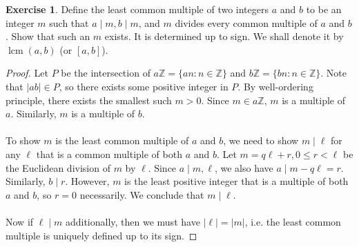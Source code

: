 \documentclass{article}
\theoremstyle{definition}
\newtheorem{exercise}{Exercise}
\begin{document}
\begin{exercise}
Define the least common multiple of two integers $a$ and $b$ to be an integer $m$ such that $a \mid m, b \mid m$, and $m$  divides every common multiple of $a$ and $b$. Show that such an $m$ exists. It is determined up to sign. We shall denote it by $\operatorname{lcm}(a, b)$ (or $[a, b]$).
\end{exercise}
\begin{proof}
Let $P$ be the intersection of $a \mathbb{Z} = \{ an : n \in \mathbb{Z} \}$ and $b \mathbb{Z} = \{ bn : n \in \mathbb{Z} \}$. Note that $|ab| \in P$, so there exists some positive integer in $P$. By well-ordering principle, there exists the smallest such $m > 0$. Since $m \in a \mathbb{Z}$, $m$ is a multiple of $a$. Similarly, $m$ is a multiple of $b$.
\\
\\
To show $m$ is the least common multiple of $a$ and $b$, we need to show $m \mid \ell$ for any $\ell$ that is a common multiple of both $a$ and $b$. Let $m = q \ell + r, 0 \leq r < \ell$ be the Euclidean division of $m$ by $\ell$. Since $a \mid m, \ell$, we also have $a \mid m - q \ell = r$. Similarly, $b \mid r$. However, $m$ is the least positive integer that is a multiple of both $a$ and $b$, so $r = 0$ necessarily. We conclude that $m \mid \ell$.
\\
\\
Now if $\ell \mid m$ additionally, then we must have $|\ell| = |m|$, i.e. the least common multiple is uniquely defined up to its sign.
\end{proof}

\newpage
\end{document}
